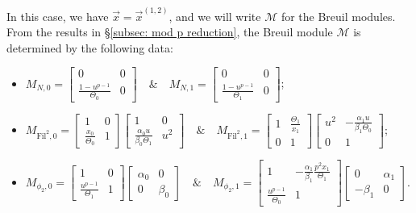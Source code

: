 \documentclass[11pt]{amsart}
\theoremstyle{definition}
\numberwithin{equation}{subsection}
\theoremstyle{plain}
\theoremstyle{plain}
\theoremstyle{plain}
\theoremstyle{plain}
\theoremstyle{plain}
\theoremstyle{plain}
\theoremstyle{plain}
\theoremstyle{plain}
\theoremstyle{plain}
\theoremstyle{plain}
\theoremstyle{plain}
\theoremstyle{plain}
\theoremstyle{definition}
\theoremstyle{definition}
\theoremstyle{definition}
\theoremstyle{remark}
\renewcommand{\(}{\textup{(}}
\renewcommand{\)}{\textup{)}}
\newcommand{\cM}{\mathcal{M}}
\newcommand{\Fil}{\mathrm{Fil}}
\newcommand{\vx}{\vec{x}}
\begin{document}
In this case, we have $\vx=\vx^{(1,2)}$, and we will write $\cM$ for the Breuil modules. From the results in \S\ref{subsec: mod p reduction}, the Breuil module $\cM$ is determined by the following data:
\begin{itemize}[leftmargin=*]
  \item $M_{N,0}=
  \begin{bmatrix}
    0 & 0 \\
    \frac{1-u^{p-1}}{\Theta_0} & 0
  \end{bmatrix}\quad\&\quad  M_{N,1}=
  \begin{bmatrix}
    0 & 0 \\
    \frac{1-u^{p-1}}{\Theta_1} & 0
  \end{bmatrix}$;
  \item $M_{\Fil^2,0}=
  \begin{bmatrix}
    1 & 0 \\
    \frac{x_0}{\Theta_0} & 1
  \end{bmatrix}
  \begin{bmatrix}
    1 & 0 \\
    \frac{\alpha_0 u}{\beta_0\Theta_1} & u^2
  \end{bmatrix}\quad\&\quad M_{\Fil^2,1}=
  \begin{bmatrix}
    1 & \frac{\Theta_1}{x_1} \\
    0 & 1
  \end{bmatrix}
  \begin{bmatrix}
    u^2 & -\frac{\alpha_1 u}{\beta_1\Theta_0} \\
    0 & 1
  \end{bmatrix}$;
  \item $M_{\phi_2,0}=
  \begin{bmatrix}
    1 & 0 \\
    \frac{u^{p-1}}{\Theta_1} & 1
  \end{bmatrix}
  \begin{bmatrix}
    \alpha_0 & 0 \\
    0 & \beta_0
  \end{bmatrix}\quad\&\quad
  M_{\phi_2,1}=
  \begin{bmatrix}
    1 & -\frac{\alpha_1}{\beta_1}\frac{p^2x_1}{\Theta_1} \\
    \frac{u^{p-1}}{\Theta_0} & 1
  \end{bmatrix}
  \begin{bmatrix}
    0 & \alpha_1 \\
    -\beta_1 & 0
  \end{bmatrix}.$
\end{itemize}
\end{document}
